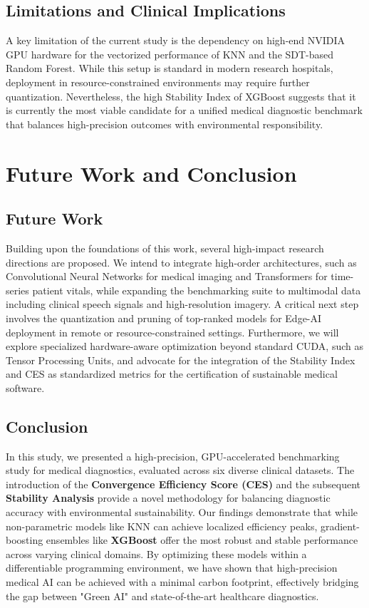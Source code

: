 \documentclass[conference]{IEEEtran}
\begin{document}
\subsection{Limitations and Clinical Implications}
A key limitation of the current study is the dependency on high-end NVIDIA GPU hardware for the vectorized performance of KNN and the SDT-based Random Forest. While this setup is standard in modern research hospitals, deployment in resource-constrained environments may require further quantization. Nevertheless, the high Stability Index of XGBoost suggests that it is currently the most viable candidate for a unified medical diagnostic benchmark that balances high-precision outcomes with environmental responsibility.
\section{Future Work and Conclusion}

\subsection{Future Work}
Building upon the foundations of this work, several high-impact research directions are proposed. We intend to integrate high-order architectures, such as Convolutional Neural Networks for medical imaging and Transformers for time-series patient vitals, while expanding the benchmarking suite to multimodal data including clinical speech signals and high-resolution imagery. A critical next step involves the quantization and pruning of top-ranked models for Edge-AI deployment in remote or resource-constrained settings. Furthermore, we will explore specialized hardware-aware optimization beyond standard CUDA, such as Tensor Processing Units, and advocate for the integration of the Stability Index and CES as standardized metrics for the certification of sustainable medical software.

\subsection{Conclusion}
In this study, we presented a high-precision, GPU-accelerated benchmarking study for medical diagnostics, evaluated across six diverse clinical datasets. The introduction of the \textbf{Convergence Efficiency Score (CES)} and the subsequent \textbf{Stability Analysis} provide a novel methodology for balancing diagnostic accuracy with environmental sustainability. Our findings demonstrate that while non-parametric models like KNN can achieve localized efficiency peaks, gradient-boosting ensembles like \textbf{XGBoost} offer the most robust and stable performance across varying clinical domains. By optimizing these models within a differentiable programming environment, we have shown that high-precision medical AI can be achieved with a minimal carbon footprint, effectively bridging the gap between "Green AI" and state-of-the-art healthcare diagnostics.
\vspace{2ex}
\end{document}
